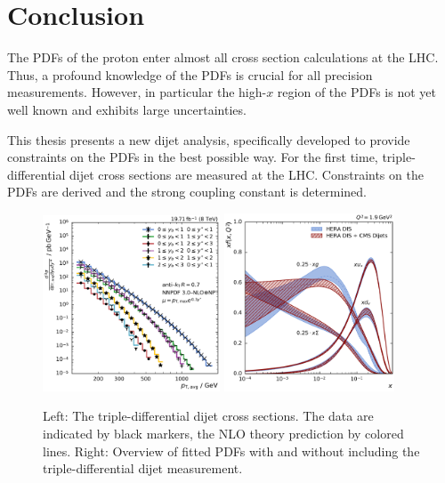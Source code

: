
\chapter{Conclusion}

The PDFs of the proton enter almost all cross section calculations at the LHC. Thus, a
profound knowledge of the PDFs is crucial for all precision measurements.
However, in particular the high-$x$ region of the PDFs is not yet well known and
exhibits large uncertainties.

This thesis presents a new dijet analysis, specifically developed to provide
constraints on the PDFs in the best possible way. For the first time,
triple-differential dijet cross sections are measured at the LHC.
Constraints on the PDFs are derived and the strong coupling constant is
determined.
\\[-6pt]
\begin{figure}[btp]
    \centering
    \includegraphics[width=0.47\textwidth]{figures/measurement/ptavg_spectrum.pdf}\hfill
    \includegraphics[width=0.45\textwidth]{figures/pdf_constraints/pdfcomp_direct_overview_1.9.pdf}
    \caption[Summary plot of results]{Left:
    The triple-differential dijet cross sections. The data are indicated by black
    markers, the NLO theory prediction by colored lines. Right: Overview of
    fitted PDFs with and without including the triple-differential dijet
    measurement.}
    \label{fig:conclusion}
\end{figure}

